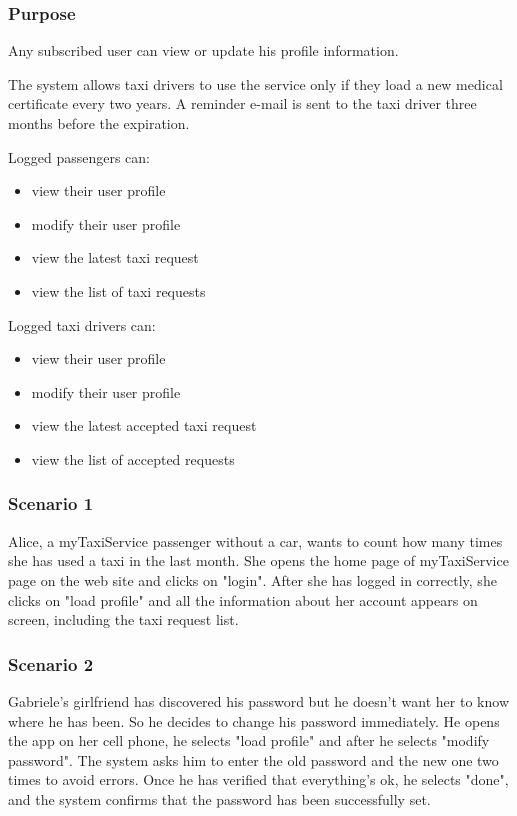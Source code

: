 \label{user-profile}
\subsubsection{Purpose}
Any subscribed user can view or update his profile information. 

The system allows taxi drivers to use the service only if they load a new medical certificate every two years. A reminder e-mail is sent to the taxi driver three months before the expiration. %

Logged passengers can:
\begin{itemize}
\item view their user profile
\item modify their user profile
\item view the latest taxi request
\item view the list of taxi requests
\end{itemize}

Logged taxi drivers can:
\begin{itemize}
\item view their user profile
\item modify their user profile
\item view the latest accepted taxi request
\item view the list of accepted requests
\end{itemize}

\subsubsection{Scenario 1}
Alice, a myTaxiService passenger without a car, wants to count how many times she has used a taxi in the last month.
She opens the home page of myTaxiService page on the web site and clicks on "login". 
After she has logged in correctly, she clicks on "load profile" and all the information about her account appears on screen, including the taxi request list. 

\subsubsection{Scenario 2}
Gabriele's girlfriend has discovered his password but he doesn't want her to know where he has been. So he decides to change his password immediately. He opens the app on her cell phone, he selects "load profile" and after he selects "modify password". The system asks him to enter the old password and the new one two times to avoid errors. Once he has verified that everything's ok, he selects "done", and the system confirms that the password has been successfully set.

